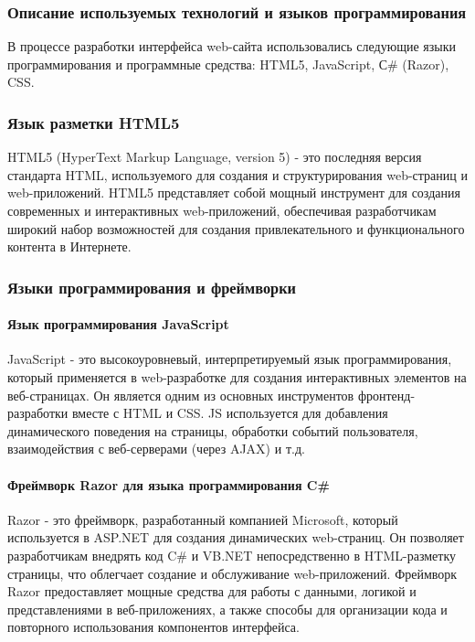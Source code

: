 \subsubsection{Описание используемых технологий и языков программирования}

В процессе разработки интерфейса web-сайта использовались следующие языки программирования и программные средства: HTML5, JavaScript, С\# (Razor), CSS.

\subsubsection{Язык разметки HTML5}

HTML5 (HyperText Markup Language, version 5) - это последняя версия стандарта HTML, используемого для создания и структурирования web-страниц и web-приложений. HTML5 представляет собой мощный инструмент для создания современных и интерактивных web-приложений, обеспечивая разработчикам широкий набор возможностей для создания привлекательного и функционального контента в Интернете.

\subsubsection{Языки программирования и фреймворки}

\paragraph{Язык программирования JavaScript}

JavaScript - это высокоуровневый, интерпретируемый язык программирования, который применяется в web-разработке для создания интерактивных элементов на веб-страницах. Он является одним из основных инструментов фронтенд-разработки вместе с HTML и CSS. JS используется для добавления динамического поведения на страницы, обработки событий пользователя, взаимодействия с веб-серверами (через AJAX) и т.д.

\paragraph{Фреймворк Razor для языка программирования C\#}
Razor - это фреймворк, разработанный компанией Microsoft, который используется в ASP.NET для создания динамических web-страниц. Он позволяет разработчикам внедрять код C\# и VB.NET непосредственно в HTML-разметку страницы, что облегчает создание и обслуживание web-приложений. Фреймворк Razor предоставляет мощные средства для работы с данными, логикой и представлениями в веб-приложениях, а также способы для организации кода и повторного использования компонентов интерфейса.


